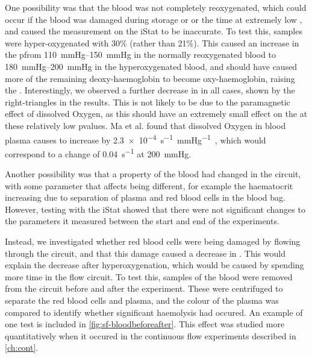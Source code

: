 One possibility was that the blood was not completely reoxygenated, which could occur if the blood was damaged during storage or or the time at extremely low \SOtwo, and caused the \SOtwo measurement on the iStat to be inaccurate.
To test this, samples were hyper-oxygenated with 30\% \Otwo (rather than 21\%).
This caused an increase in the p\Otwo from \SIrange{110}{150}{mmHg} in the normally reoxygenated blood to \SIrange{180}{200}{mmHg} in the hyperoxygenated blood, and should have caused more of the remaining deoxy-haemoglobin to become oxy-haemoglobin, raising the \Ttwo.
Interestingly, we observed a further decrease in \Ttwo in all cases, shown by the right-triangles in the results.
This is not likely to be due to the paramagnetic effect of dissolved Oxygen, as this should have an extremely small effect on the \Ttwo at these relatively low p\Otwo values.
Ma et al. found that dissolved Oxygen in blood plasma causes \Rtwo to increase by \SI{2.3e-4}{s^{-1}\per\mmHg}~\cite{Maeffectdissolvedoxygen2016}, which would correspond to a change of \SI{0.04}{s^{-1}} at \SI{200}{mmHg}.

Another possibility was that a property of the blood had changed in the circuit, with some parameter that affects \Ttwo being different, for example the haematocrit increasing due to separation of plasma and red blood cells in the blood bag.
However, testing with the iStat showed that there were not significant changes to the parameters it measured between the start and end of the experiments.

Instead, we investigated whether red blood cells were being damaged by flowing through the circuit, and that this damage caused a decrease in \Ttwo.
This would explain the \Ttwo decrease after hyperoxygenation, which would be caused by spending more time in the flow circuit.
To test this, samples of the blood were removed from the circuit before and after the experiment.
These were centrifuged to separate the red blood cells and plasma, and the colour of the plasma was compared to identify whether significant haemolysis had occured.
An example of one test is included in \autoref{fig:sf-bloodbeforeafter}.
This effect was studied more quantitatively when it occured in the continuous flow experiments described in \autoref{ch:cont}.

